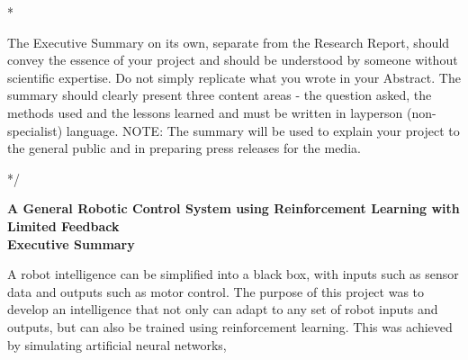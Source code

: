 \documentclass[letterpaper,12pt]{article}
\begin{document}
\/*

The Executive Summary on its own, separate from the Research Report, should convey the essence of your project and should be understood by someone without scientific expertise. Do not simply replicate what you wrote in your Abstract. The summary should clearly present three content areas - the question asked, the methods used and the lessons learned and must be written in layperson (non-specialist) language. NOTE: The summary will be used to explain your project to the general public and in preparing press releases for the media.

*/

\begin{center}
	{\Large
	\textbf{A General Robotic Control System using Reinforcement Learning with Limited Feedback}}\\
	\vspace{1cm}
	{\large \textbf{Executive Summary}}
\end{center}

\noindent

A robot intelligence can be simplified into a black box, with inputs such as sensor data and outputs such as motor control.  The purpose of this project was to develop an intelligence that not only can adapt to any set of robot inputs and outputs, but can also be trained using reinforcement learning.  This was achieved by simulating artificial neural networks, 
\end{document}
